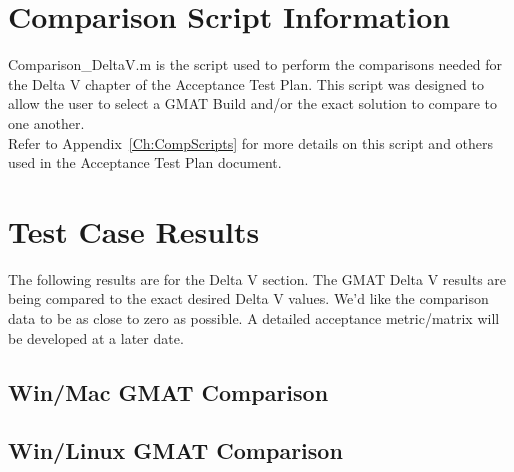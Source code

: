 \section{Comparison Script Information}
Comparison\_DeltaV.m is the script used to perform the comparisons
needed for the Delta V chapter of the Acceptance Test Plan. This
script was designed to allow the user to select a GMAT Build and/or
the exact solution to compare to one another.\\

Refer to Appendix~\ref{Ch:CompScripts} for more details on this
script and others used in the Acceptance Test Plan document.

\clearpage
\section{Test Case Results}
The following results are for the Delta V section. The GMAT Delta V
results are being compared to the exact desired Delta V values. We'd
like the comparison data to be as close to zero as possible. A
detailed acceptance metric/matrix will be developed at a later date.





\clearpage

\subsection{Win/Mac GMAT Comparison}





\subsection{Win/Linux GMAT Comparison}




